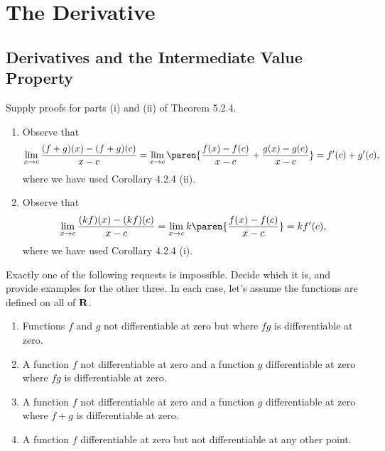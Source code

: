 \documentclass{lew98_solutions}
\begin{document}
\chapter{The Derivative}
\label{chap:5}

\setcounter{section}{1}
\section{Derivatives and the Intermediate Value Property}
\label{sec:5.2}

\begin{exercise}
\label{ex:5.2.1}
    Supply proofs for parts (i) and (ii) of Theorem 5.2.4.
\end{exercise}

\begin{solution}
    \begin{enumerate}[label = (\roman*)]
        \item Observe that
        \[
            \lim_{x \to c} \frac{(f + g)(x) - (f + g)(c)}{x - c} = \lim_{x \to c} \paren{\frac{f(x) - f(c)}{x - c} + \frac{g(x) - g(c)}{x - c}} = f'(c) + g'(c),
        \]
        where we have used Corollary 4.2.4 (ii).

        \item Observe that
        \[
            \lim_{x \to c} \frac{(kf)(x) - (kf)(c)}{x - c} = \lim_{x \to c} k \paren{\frac{f(x) - f(c)}{x - c}} = k f'(c),
        \]
        where we have used Corollary 4.2.4 (i).
    \end{enumerate}
\end{solution}

\begin{exercise}
\label{ex:5.2.2}
    Exactly one of the following requests is impossible. Decide which it is, and provide examples for the other three. In each case, let's assume the functions are defined on all of \( \mathbf{R} \).
    \begin{enumerate}
        \item Functions \( f \) and \( g \) not differentiable at zero but where \( fg \) is differentiable at zero.

        \item A function \( f \) not differentiable at zero and a function \( g \) differentiable at zero where \( fg \) is differentiable at zero.

        \item A function \( f \) not differentiable at zero and a function \( g \) differentiable at zero where \( f + g \) is differentiable at zero.

        \item A function \( f \) differentiable at zero but not differentiable at any other point.
    \end{enumerate}
\end{exercise}
\end{document}
